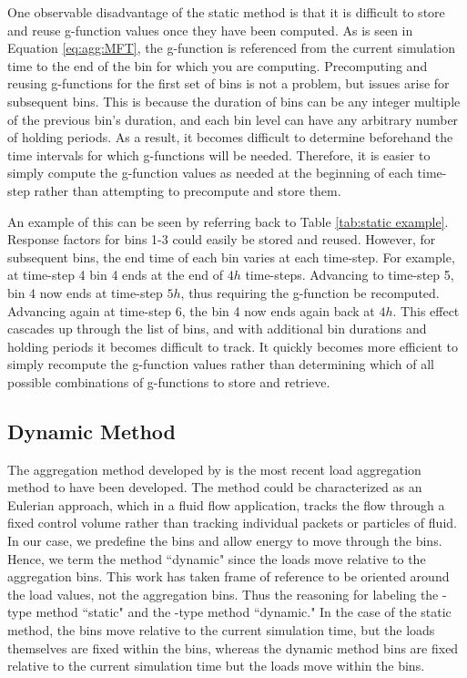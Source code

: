 \documentclass[review,12pt]{elsarticle}
\begin{document}
One observable disadvantage of the static method is that it is difficult to store and reuse g-function values once they have been computed. As is seen in Equation \ref{eq:agg:MFT}, the g-function is referenced from the current simulation time to the end of the bin for which you are computing. Precomputing and reusing g-functions for the first set of bins is not a problem, but issues arise for subsequent bins. This is because the duration of bins can be any integer multiple of the previous bin's duration, and each bin level can have any arbitrary number of holding periods. As a result, it becomes difficult to determine beforehand the time intervals for which g-functions will be needed. Therefore, it is easier to simply compute the g-function values as needed at the beginning of each time-step rather than attempting to precompute and store them.

An example of this can be seen by referring back to Table \ref{tab:static example}. Response factors for bins 1-3 could easily be stored and reused. However, for subsequent bins, the end time of each bin varies at each time-step. For example, at time-step 4 bin 4 ends at the end of $4h$ time-steps. Advancing to time-step 5, bin 4 now ends at time-step $5h$, thus requiring the g-function be recomputed. Advancing again at time-step 6, the bin 4 now ends again back at $4h$. This effect cascades up through the list of bins, and with additional bin durations and holding periods it becomes difficult to track. It quickly becomes more efficient to simply recompute the g-function values rather than determining which of all possible combinations of g-functions to store and retrieve.

\subsection{Dynamic Method}

The aggregation method developed by \cite{ClaessonJaved2012} is the most recent load aggregation method to have been developed. The method could be characterized as an Eulerian approach, which in a fluid flow application, tracks the flow through a fixed control volume rather than tracking individual packets or particles of fluid. In our case, we predefine the bins and allow energy to move through the bins. Hence, we term the method ``dynamic" since the loads move relative to the aggregation bins. This work has taken frame of reference to be oriented around the load values, not the aggregation bins. Thus the reasoning for labeling the \cite{YavuzturkSpitler1999}-type method ``static" and the \cite{ClaessonJaved2012}-type method ``dynamic." In the case of the static method, the bins move relative to the current simulation time, but the loads themselves are fixed within the bins, whereas the dynamic method bins are fixed relative to the current simulation time but the loads move within the bins.
\end{document}
